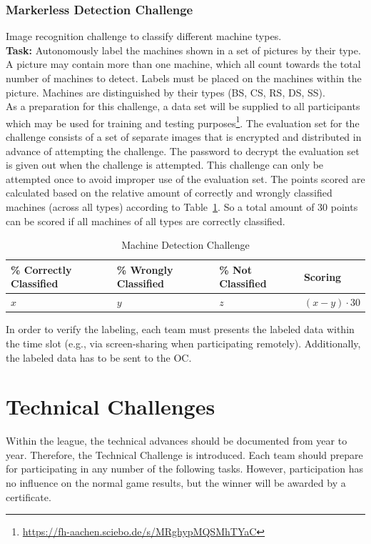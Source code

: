 \documentclass[12pt,twoside]{article}
\newcommand{\reftab}[1]{Table~\ref{#1}}
\begin{document}
\subsubsection{Markerless Detection Challenge}\label{sec:challenge-markerless}
Image recognition challenge to classify different machine types.\\
\textbf{Task:} Autonomously label the machines shown in a set of pictures
by their type.
A picture may contain more than one machine, which all count towards the
total number of machines to detect. Labels must be placed on the machines
within the picture. Machines are distinguished by their types
(BS, CS, RS, DS, SS).\\
As a preparation for this challenge, a data set will be supplied to
all participants which may be used for training and testing
purposes\footnote{\url{https://fh-aachen.sciebo.de/s/MRghypMQSMhTYaC}}.
The evaluation set for the challenge consists of a set of separate images that
is encrypted and distributed in advance of attempting the challenge.
The password to decrypt the evaluation set is given out when the challenge
is attempted.
This challenge can only be attempted once to avoid improper use of the
evaluation set.
The points scored are calculated based on the relative amount of correctly
and wrongly classified machines (across all types) according to
\reftab{tab:challenge-markerless}. So a total amount of 30 points can be scored
if all machines of all types are correctly classified.
\begin{table}[!htb]
 \centering
 \begin{tabularx}{\linewidth}{l|l|l|l}
  \% Correctly Classified & \% Wrongly Classified & \% Not Classified
  & Scoring \\\hline
  $x$ & $y$ & $z$ & $(x-y)\cdot30$
 \end{tabularx}
 \caption{Machine Detection Challenge}
 \label{tab:challenge-markerless}
\end{table}

In order to verify the labeling, each team must presents the labeled data
within the time slot (e.g., via screen-sharing when participating remotely).
Additionally, the labeled data has to be sent to the \ac{OC}.


\section{Technical Challenges}
\label{sec:technical-challenge}
Within the league, the technical advances should be documented from
year to year. Therefore, the Technical Challenge is introduced. Each
team should prepare for participating in any number of the following
tasks. However, participation has no influence on the normal game
results, but the winner will be awarded by a certificate.
\end{document}
